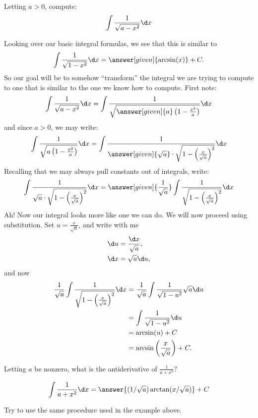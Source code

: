 \documentclass[nooutcomes]{ximera}
\begin{document}
\begin{example} 

  Letting $a>0$, compute:
  \[
  \int \frac{1}{\sqrt{a-x^2}} \d x
  \]
  \begin{explanation}
    Looking over our basic integral formulas, we see that this is similar to
    \[
    \int \frac{1}{\sqrt{1-x^2}}\d x= \answer[given]{\arcsin(x)}+C.
    \]
    So our goal will be to somehow ``transform'' the integral we are
    trying to compute to one that is similar to the one we know how to
    compute. First note:
    \[
    \int \frac{1}{\sqrt{a-x^2}} \d x  =
    \int \frac{1}{\sqrt{\answer[given]{a}\left(1-\frac{x^2}{a}\right)}} \d x
    \]
    and since $a>0$, we may write:
    \[
    \int \frac{1}{\sqrt{a\left(1-\frac{x^2}{a}\right)}} \d x=
    \int \frac{1}{\answer[given]{\sqrt{a}}\cdot \sqrt{1-\left(\frac{x}{\sqrt{a}}\right)^2}} \d x
    \]
    Recalling that we may always pull constants out of integrals, write:
    \[
    \int \frac{1}{\sqrt{a}\cdot \sqrt{1-\left(\frac{x}{\sqrt{a}}\right)^2}} \d x = 
    \answer[given]{\frac{1}{\sqrt{a}}}\int \frac{1}{\sqrt{1-\left(\frac{x}{\sqrt{a}}\right)^2}} \d x 
    \]
    Ah! Now our integral looks more like one we can do. We will now
    proceed using substitution. Set $u = \frac{x}{\sqrt{a}}$, and write with me
    \begin{align*}
      \d u &= \frac{\d x}{\sqrt{a}},\\
      \d x &= \sqrt{a}\d u,
    \end{align*}
    and now
    \begin{align*}
    \frac{1}{\sqrt{a}}\int \frac{1}{\sqrt{1-\left(\frac{x}{\sqrt{a}}\right)^2}} \d x &=
    \frac{1}{\sqrt{a}}\int \frac{1}{\sqrt{1-u^2}} \sqrt{a} \d u\\
    &=\int \frac{1}{\sqrt{1-u^2}}\d u\\
    &=\arcsin(u) + C\\
    &=\arcsin\left(\frac{x}{\sqrt{a}}\right) + C.
    \end{align*}
  \end{explanation}
\end{example}




\begin{question}
  Letting $a$ be nonzero, what is the antiderivative of $\frac{1}{a +
    x^2}$?
  \begin{prompt}
    \[
    \int \frac{1}{a + x^2} \d x = \answer{(1/\sqrt{a}) \arctan(x/\sqrt{a})}+C
    \]
  \end{prompt}
  \begin{hint}
    Try to use the same procedure used in the example above.
  \end{hint}
\end{question}
\end{document}
